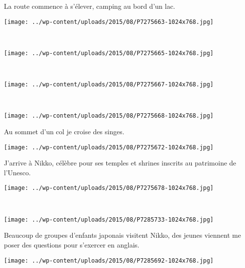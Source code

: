  La route commence à s'élever, camping au bord d'un lac.\\
\begin{center} \texttt{[image: ../wp-content/uploads/2015/08/P7275663-1024x768.jpg]} \end{center}
~
\begin{center} \texttt{[image: ../wp-content/uploads/2015/08/P7275665-1024x768.jpg]} \end{center}
\vspace{-\topsep}
\pagebreak
~
\begin{center} \texttt{[image: ../wp-content/uploads/2015/08/P7275667-1024x768.jpg]} \end{center}
~\\
\begin{center} \texttt{[image: ../wp-content/uploads/2015/08/P7275668-1024x768.jpg]} \end{center}
\vspace{-\topsep}
\pagebreak

 Au sommet d'un col je croise des singes.
\begin{center} \texttt{[image: ../wp-content/uploads/2015/08/P7275672-1024x768.jpg]} \end{center}

 J'arrive à Nikko, célèbre pour ses temples et shrines inscrits au patrimoine de l'Unesco. 
\begin{center} \texttt{[image: ../wp-content/uploads/2015/08/P7275678-1024x768.jpg]} \end{center}
\vspace{-\topsep}
\pagebreak
~
\begin{center} \texttt{[image: ../wp-content/uploads/2015/08/P7285733-1024x768.jpg]} \end{center}

  Beaucoup de groupes d'enfants japonais visitent Nikko, des jeunes viennent me poser des questions pour s'exercer en anglais. 
\begin{center} \texttt{[image: ../wp-content/uploads/2015/08/P7285692-1024x768.jpg]} \end{center}
\vspace{-\topsep}
\pagebreak

